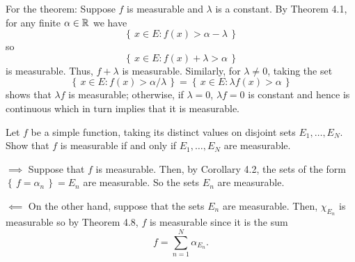 \begin{solution}

  For the theorem: Suppose \(f\) is measurable and \(\lambda\) is a
  constant. By Theorem 4.1, for any finite \(\alpha\in\mathbb{R}\) we have
  \[
    \left\{\,x\in E:f(x)>\alpha-\lambda\,\right\}
  \]
  so
  \[
    \left\{\,x\in E:f(x)+\lambda>\alpha\,\right\}
  \]
  is measurable. Thus, \(f+\lambda\) is measurable. Similarly, for
  \(\lambda\neq 0\), taking the set
  \[
    \left\{\,x\in E:f(x)>\alpha/\lambda\,\right\}
    =
    \left\{\,x\in E:\lambda f(x)>\alpha\,\right\}
  \]
  shows that \(\lambda f\) is measurable; otherwise, if \(\lambda=0\),
  \(\lambda f=0\) is constant and hence is continuous which in turn implies
  that it is measurable.
\end{solution}

\begin{problem}
  Let \(f\) be a simple function, taking its distinct values on disjoint
  sets \(E_1,\dotsc,E_N\). Show that \(f\) is measurable if and only if
  \(E_1,\dotsc,E_N\) are measurable.
\end{problem}
\begin{solution}
  \(\implies\) Suppose that \(f\) is measurable. Then, by Corollary 4.2,
  the sets of the form \(\left\{\,f=\alpha_n\,\right\}=E_n\) are
  measurable. So the sets \(E_n\) are measurable.

  \(\impliedby\) On the other hand, suppose that the sets \(E_n\) are
  measurable. Then, \(\chi_{E_n}\) is measurable so by Theorem 4.8, \(f\)
  is measurable since it is the sum
  \[
    f=\sum_{n=1}^N \alpha_{E_n}.
  \]
\end{solution}

